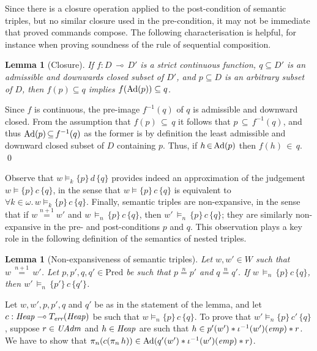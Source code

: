 \documentclass{LMCS}
\newtheorem{lemma}[theorem]{Lemma}
\theoremstyle{remark}
\newcommand{\TERR}{\ensuremath{T_\textit{err}}\xspace}
\newcommand{\sto}{\ensuremath{\multimap}}
\newcommand{\triple}[3]{{\ensuremath{\!\left.\{ #1 \}\, #2\, \{  #3 \}\!\right.}}}
\newcommand{\wemp}{\textnormal{\textit{emp}}}
\newcommand{\Pred}{\ensuremath{\mathrm{Pred}}\xspace}
\newcommand{\W}{\ensuremath{W}}
\newcommand{\UNFOLD}{\ensuremath{\iota^{-1}}}
\newcommand{\nequiv}[1]{\ensuremath{\mathrel{\stackrel{#1}{=}}}}
\begin{document}
Since there is a closure operation applied to the post-condition of semantic triples, but no similar closure used in the pre-condition, it may not be immediate that   proved commands compose. The following characterisation is helpful, for instance when proving soundness of the rule of sequential composition. 
\begin{lemma}[Closure]
\label{lem:precondition-closure}
If $f{:}D\,{\sto}\,D'$ is a strict continuous function, $q\subseteq D'$ is an admissible and downwards closed subset of $D'$, and $p\subseteq D$ is an arbitrary subset of $D$, 
then $f(p)\subseteq q$ implies $f(\mathrm{Ad}(p))\subseteq q$. 
\end{lemma}
\proof
Since $f$ is continuous, the pre-image $f^{-1}(q)$ of $q$ is admissible and downward closed. 
From the assumption that $f(p)\,{\subseteq}\, q$ it follows that $p\,{\subseteq}\,f^{-1}(q)$, and thus $\mathrm{Ad}(p)\,{\subseteq}\,f^{-1}(q)$ as the former is by definition the least admissible and downward closed subset of $D$ containing $p$. 
Thus, if $h\,{\in}\,\mathrm{Ad}(p)$ then $f(h)\,{\in}\,q$. \qed






Observe that $w\models_k \triple{p}{d}{q}$ provides indeed an approximation of the judgement $w\models \triple{p}{c}{q}$, in the sense that $w\models \triple{p}{c}{q}$ is equivalent to  $\forall  k\in\omega.\, w\models_k \triple{p}{c}{q}$. 
Finally, semantic triples are non-expansive, in the sense that if 
$w {\nequiv{n+1}} w'$ and $w\,{\models}_n\,\triple pcq$, then $w'\,{\models}_{n}\,\triple p{
c}q$; they are similarly non-expansive in the pre- and post-conditions $p$ and $q$. 
This observation plays a key role in the following definition of the semantics of nested triples. 




\begin{lemma}[Non-expansiveness of semantic triples] 
\label{lem:semantic-triples-key}
Let $w,w'\in\W$ such that $w\,{\nequiv{n{+}1}}\,w'$. 
Let $p,p',q,q'\in\Pred$ be such that $p\nequiv n p'$ and $q\nequiv n q'$. 
If $w\,{\models}_n\,\triple pcq$, then $w'\,{\models}_{n}\,\triple {p'}{
c}{q'}$. 
\end{lemma}
\proof
Let $w,w',p,p',q$ and $q'$ be as in the statement of the lemma, and 
let $c:\Heap\sto\TERR(\Heap)$ be such that $w\models_n\triple pcq$. 
To prove that $w'\models_n\triple p{c'}q$, suppose $r\in \mathit{UAdm}$ and $h\in\mathit{Heap}$ are such that 
$h\in p'(w') * \UNFOLD(w')(\wemp) *r$. We have to show that 
$\pi_n(c(\pi_n\,h))\in \DCl(q'(w') * \UNFOLD(w')(\wemp) *r)$. 
\end{document}
